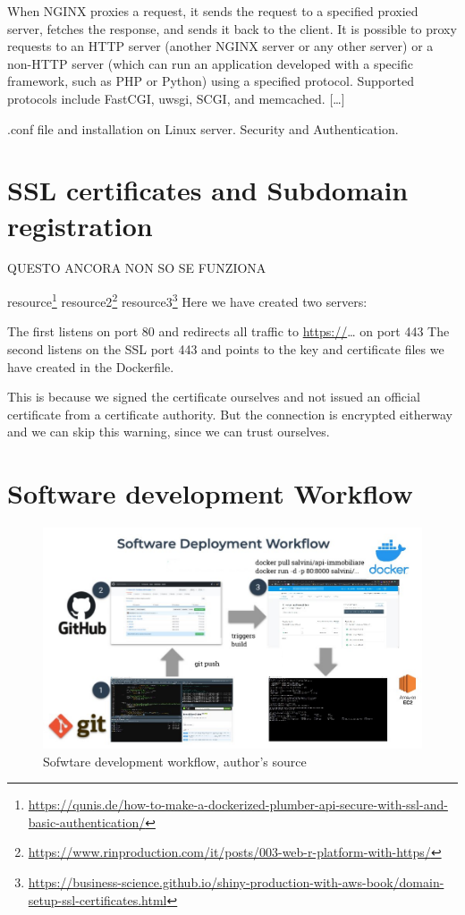 \documentclass[
  12pt,
  a4paper,
  oneside]{book}
\DeclareRobustCommand{\href}[2]{#2\footnote{\url{#1}}}
\theoremstyle{definition}
\theoremstyle{definition}
\theoremstyle{definition}
\theoremstyle{remark}
\begin{document}
When NGINX proxies a request, it sends the request to a specified proxied server, fetches the response, and sends it back to the client. It is possible to proxy requests to an HTTP server (another NGINX server or any other server) or a non-HTTP server (which can run an application developed with a specific framework, such as PHP or Python) using a specified protocol. Supported protocols include FastCGI, uwsgi, SCGI, and memcached.
{[}\ldots{]}

.conf file and installation on Linux server. Security and Authentication.

\hypertarget{SSL}{%
\section{SSL certificates and Subdomain registration}\label{SSL}}

QUESTO ANCORA NON SO SE FUNZIONA

\href{https://qunis.de/how-to-make-a-dockerized-plumber-api-secure-with-ssl-and-basic-authentication/}{resource}
\href{https://www.rinproduction.com/it/posts/003-web-r-platform-with-https/}{resource2}
\href{https://business-science.github.io/shiny-production-with-aws-book/domain-setup-ssl-certificates.html}{resource3}
Here we have created two servers:

The first listens on port 80 and redirects all traffic to \url{https://}\ldots{} on port 443
The second listens on the SSL port 443 and points to the key and certificate files we have created in the Dockerfile.

This is because we signed the certificate ourselves and not issued an official certificate from a certificate authority. But the connection is encrypted eitherway and we can skip this warning, since we can trust ourselves.

\hypertarget{software-development-workflow}{%
\section{Software development Workflow}\label{software-development-workflow}}

\begin{figure}
\centering
\includegraphics{images/SoftwareDevWF.jpg}
\caption{\label{fig:sfmap}Sofwtare development workflow, author's source}
\end{figure}
\end{document}
